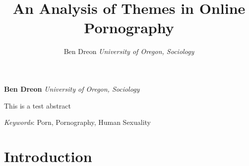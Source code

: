 \documentclass[11pt,]{article}
\title{An Analysis of Themes in Online Pornography  }
\author{\Large Ben Dreon\vspace{0.05in} \newline\normalsize\emph{University of Oregon, Sociology}  }
\date{}
\newcommand*{\authorfont}{\fontfamily{phv}\selectfont}
\renewenvironment{abstract}
 {{%
    \setlength{\leftmargin}{0mm}
    \setlength{\rightmargin}{\leftmargin}%
  }%
  \relax}
 {\endlist}
\begin{document}
	
%
\setcounter{page}{1}


{%
\setlength{\parindent}{0pt}
\thispagestyle{plain}
{\fontsize{18}{20}\selectfont\raggedright 
\maketitle  %

}

{
   \vskip 13.5pt\relax \normalsize\fontsize{11}{12} 
\textbf{\authorfont Ben Dreon} \hskip 15pt \emph{\small University of Oregon, Sociology}   

}

}







\begin{abstract}

    \hbox{\vrule height .2pt width 39.14pc}

    \vskip 8.5pt %

\noindent This is a test abstract


\vskip 8.5pt \noindent \emph{Keywords}: Porn, Pornography, Human Sexuality \par

    \hbox{\vrule height .2pt width 39.14pc}



\end{abstract}


\vskip 6.5pt

\noindent  \section{Introduction}\label{introduction}
\end{document}
